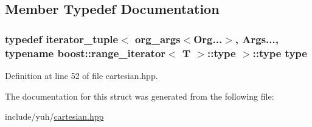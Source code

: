 \subsection{\-Member \-Typedef \-Documentation}
\hypertarget{structyuh_1_1detail_1_1iterator__tuple_3_01org__args_3_01T_00_01Org_8_8_8_4_00_01Args_8_8_8_4_a22487632bf6ac08da23ab56b24fcd551}{
\subsubsection[{type}]{\setlength{\rightskip}{0pt plus 5cm}typedef {\bf iterator\-\_\-tuple}$<$ {\bf org\-\_\-args}$<$\-Org...$>$, \-Args..., typename boost\-::range\-\_\-iterator$<$ \-T $>$\-::{\bf type} $>$\-::{\bf type} {\bf type}}}\label{d2/de2/structyuh_1_1detail_1_1iterator__tuple_3_01org__args_3_01T_00_01Org_8_8_8_4_00_01Args_8_8_8_4_a22487632bf6ac08da23ab56b24fcd551}


\-Definition at line 52 of file cartesian.\-hpp.



\-The documentation for this struct was generated from the following file\-:\begin{DoxyCompactItemize}
\item 
include/yuh/\hyperlink{cartesian_8hpp}{cartesian.\-hpp}\end{DoxyCompactItemize}
